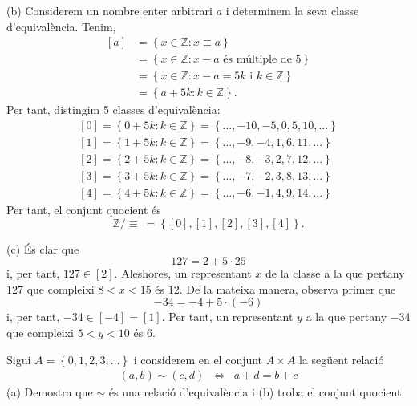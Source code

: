 \begin{solucio}
(b) Considerem un nombre enter arbitrari $a$ i determinem la seva classe
d'equival\`{e}ncia. Tenim,%
\begin{align*}
\left[ a\right] & =\left\{ x\in \mathbb{Z}:x\equiv a\right\} \\
& =\left\{ x\in \mathbb{Z}:x-a\text{ \ \'{e}s m\'{u}ltiple de }5\right\} \\
& =\left\{ x\in \mathbb{Z}:x-a=5k\text{ \ i \ }k\in \mathbb{Z}\right\} \\
& =\left\{ a+5k:k\in \mathbb{Z}\right\} \text{.}
\end{align*}%
Per tant, distingim 5 classes d'equival\`{e}ncia:%
\begin{equation*}
\begin{array}{c}
\left[ 0\right] =\left\{ 0+5k:k\in \mathbb{Z}\right\} =\left\{
...,-10,-5,0,5,10,...\right\} \\
\left[ 1\right] =\left\{ 1+5k:k\in \mathbb{Z}\right\} =\left\{
...,-9,-4,1,6,11,...\right\} \\
\left[ 2\right] =\left\{ 2+5k:k\in \mathbb{Z}\right\} =\left\{
...,-8,-3,2,7,12,...\right\} \\
\left[ 3\right] =\left\{ 3+5k:k\in \mathbb{Z}\right\} =\left\{
...,-7,-2,3,8,13,...\right\} \\
\left[ 4\right] =\left\{ 4+5k:k\in \mathbb{Z}\right\} =\left\{
...,-6,-1,4,9,14,...\right\}%
\end{array}%
\end{equation*}%
Per tant, el conjunt quocient \'{e}s%
\begin{equation*}
\mathbb{Z}/\equiv ~=\left\{ \left[ 0\right] ,\left[ 1\right] ,\left[ 2\right]
,\left[ 3\right] ,\left[ 4\right] \right\} \text{.}
\end{equation*}

(c) \'{E}s clar que%
\begin{equation*}
127=2+5\cdot 25
\end{equation*}%
i, per tant, $127\in \left[ 2\right] $. Aleshores, un representant $x$ de la
classe a la que pertany $127$ que compleixi $8<x<15$ \'{e}s $12$. De la
mateixa manera, observa primer que%
\begin{equation*}
-34=-4+5\cdot (-6)
\end{equation*}%
i, per tant, $-34\in \left[ -4\right] =\left[ 1\right] $. Per tant, un
representant $y$ a la que pertany $-34$ que compleixi $5<y<10$ \'{e}s $6$.
\end{solucio}

\begin{exer}
Sigui $A=\left\{ 0,1,2,3,...\right\} $ i considerem en el conjunt $A\times A$
la seg\"{u}ent relaci\'{o}%
\begin{equation*}
\begin{array}{ccc}
(a,b)\sim (c,d) & \Longleftrightarrow & a+d=b+c%
\end{array}%
\end{equation*}%
(a) Demostra que $\sim $ \'{e}s una relaci\'{o} d'equival\`{e}ncia i (b)
troba el conjunt quocient.
\end{exer}

